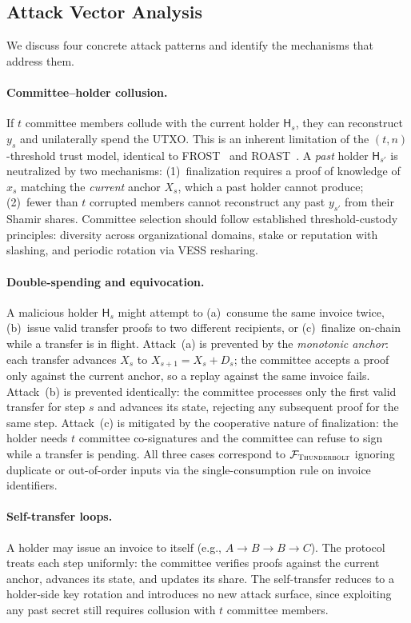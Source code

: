 \subsection{Attack Vector Analysis}\label{sec:attack-vectors}

We discuss four concrete attack patterns and identify the mechanisms
that address them.

\paragraph{Committee--holder collusion.}
If $t$ committee members collude with the current holder $\mathsf{H}_s$, they can reconstruct $y_s$
and unilaterally spend the UTXO.
This is an inherent limitation of the $(t,n)$-threshold trust model, identical to
FROST~\cite{komlo2021frost} and ROAST~\cite{ruffing2022roast}.
A \emph{past} holder $\mathsf{H}_{s'}$ is neutralized by two mechanisms:
(1)~finalization requires a proof of knowledge of $x_s$ matching the \emph{current} anchor $X_s$, which a past holder cannot produce;
(2)~fewer than $t$ corrupted members cannot reconstruct any past $y_{s'}$ from their Shamir shares.
Committee selection should follow established threshold-custody principles: diversity across organizational domains, stake or reputation with slashing, and periodic rotation via VESS resharing.

\paragraph{Double-spending and equivocation.}
A malicious holder $\mathsf{H}_s$ might attempt to (a)~consume the same invoice twice,
(b)~issue valid transfer proofs to two different recipients, or
(c)~finalize on-chain while a transfer is in flight.
Attack~(a) is prevented by the \emph{monotonic anchor}: each transfer advances $X_s$ to
$X_{s+1} = X_s + D_s$; the committee accepts a proof only against the current anchor,
so a replay against the same invoice fails.
Attack~(b) is prevented identically: the committee processes only the first valid transfer for
step $s$ and advances its state, rejecting any subsequent proof for the same step.
Attack~(c) is mitigated by the cooperative nature of finalization: the holder needs $t$
committee co-signatures and the committee can refuse to sign while a transfer is pending.
All three cases correspond to $\mathcal{F}_{\textsc{Thunderbolt}}$ ignoring duplicate or out-of-order inputs
via the single-consumption rule on invoice identifiers.

\paragraph{Self-transfer loops.}
A holder may issue an invoice to itself (e.g., $A \to B \to B \to C$). The protocol treats each step uniformly: the committee verifies proofs against the current anchor, advances its state, and updates its share. The self-transfer reduces to a holder-side key rotation and introduces no new attack surface, since exploiting any past secret still requires collusion with $t$ committee members.

